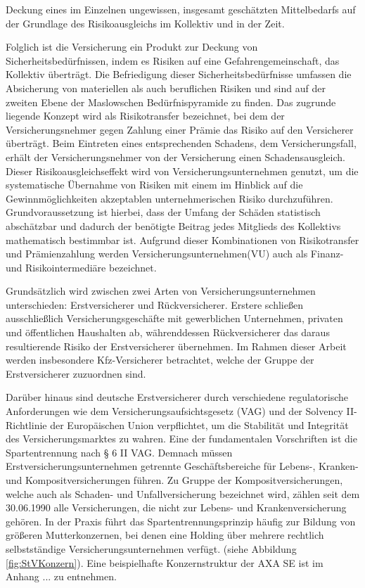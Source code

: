 \glqq Deckung eines im Einzelnen ungewissen, insgesamt geschätzten Mittelbedarfs auf der Grundlage des Risikoausgleichs im Kollektiv und in der Zeit.\grqq \autocite[S. 8f.]{FARNY2011}

Folglich ist die Versicherung ein Produkt zur Deckung von Sicherheitsbedürfnissen, indem es Risiken auf eine Gefahrengemeinschaft, das Kollektiv überträgt. Die Befriedigung dieser Sicherheitsbedürfnisse umfassen die Absicherung von materiellen als auch beruflichen Risiken und sind auf der zweiten Ebene der Maslowschen Bedürfnispyramide zu finden. \autocite[Vgl.][S. 30]{BECKER2019} Das zugrunde liegende Konzept wird als Risikotransfer bezeichnet, bei dem der Versicherungsnehmer gegen Zahlung einer Prämie das Risiko auf den Versicherer überträgt. Beim Eintreten eines entsprechenden Schadens, dem Versicherungsfall, erhält der Versicherungsnehmer von der Versicherung einen Schadensausgleich. Dieser Risikoausgleichseffekt wird von Versicherungsunternehmen genutzt, um die systematische Übernahme von Risiken mit einem im Hinblick auf die Gewinnmöglichkeiten akzeptablen unternehmerischen Risiko durchzuführen. \autocite[Vgl.][S. 9]{FARNY2011}
Grundvoraussetzung ist hierbei, dass der Umfang der Schäden statistisch abschätzbar und dadurch der benötigte Beitrag jedes Mitglieds des Kollektivs mathematisch bestimmbar ist. Aufgrund dieser Kombinationen von Risikotransfer und Prämienzahlung werden Versicherungsunternehmen(VU) auch als Finanz- und Risikointermediäre bezeichnet. \autocite[Vgl.][S. 53]{ZWACK2017}

Grundsätzlich wird zwischen zwei Arten von Versicherungsunternehmen unterschieden: Erstversicherer und Rückversicherer. Erstere schließen ausschließlich Versicherungsgeschäfte mit gewerblichen Unternehmen, privaten und öffentlichen Haushalten ab, währenddessen Rückversicherer das daraus resultierende Risiko der Erstversicherer übernehmen.\autocite[Vgl.][S. 240f.]{FARNY2011} Im Rahmen dieser Arbeit werden insbesondere Kfz-Versicherer betrachtet, welche der Gruppe der Erstversicherer zuzuordnen sind.

Darüber hinaus sind deutsche Erstversicherer durch verschiedene regulatorische Anforderungen wie dem Versicherungsaufsichtsgesetz (VAG) und der Solvency II-Richtlinie der Europäischen Union verpflichtet, um die Stabilität und Integrität des Versicherungsmarktes zu wahren. \autocite[Vgl.][]{BAFIN2016} Eine der fundamentalen Vorschriften ist die Spartentrennung nach § 6 II VAG. Demnach müssen Erstversicherungsunternehmen getrennte Geschäftsbereiche für Lebens-, Kranken- und Kompositversicherungen führen. Zu Gruppe der Kompositversicherungen, welche auch als Schaden- und Unfallversicherung bezeichnet wird, zählen seit dem 30.06.1990 alle Versicherungen, die nicht zur Lebens- und Krankenversicherung gehören. \autocite[Vgl.][S. 241-243]{FARNY2011} In der Praxis führt das Spartentrennungsprinzip häufig zur Bildung von größeren Mutterkonzernen, bei denen eine Holding über mehrere rechtlich selbstständige Versicherungsunternehmen verfügt. (siehe Abbildung \vref{fig:StVKonzern}). Eine beispielhafte Konzernstruktur der AXA SE ist im Anhang ... zu entnehmen. \autocite[Vgl.][S. 241-243]{AXAKONZERNSTRUKTUR2023}

